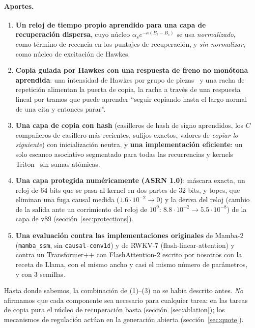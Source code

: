 \documentclass[11pt]{article}
\begin{document}
\paragraph{Aportes.}
\begin{enumerate}[label=(\arabic*)]
\item \textbf{Un reloj de tiempo propio aprendido para una capa de recuperación dispersa}, cuyo núcleo
  $\alpha_s e^{-\kappa(B_t-B_s)}$ se usa \emph{normalizado}, como término de recencia en los puntajes de recuperación,
  y \emph{sin normalizar}, como núcleo de excitación de Hawkes.
\item \textbf{Copia guiada por Hawkes con una respuesta de freno no monótona aprendida}: una intensidad de Hawkes por
  grupo de piezas~\cite{hawkes1971spectra} y una racha de repetición alimentan la puerta de copia, la racha a través de
  una respuesta lineal por tramos que puede aprender ``seguir copiando hasta el largo normal de una cita y entonces
  parar''.
\item \textbf{Una capa de copia con hash} (casilleros de hash de signo aprendidos, los $C$ compañeros de casillero más
  recientes, sufijos exactos, valores de \emph{copiar lo siguiente}) con inicialización neutra, y \textbf{una
  implementación eficiente}: un solo escaneo asociativo segmentado para todas las recurrencias y kernels
  Triton~\cite{tillet2019triton} sin sumas atómicas.
\item \textbf{Una capa protegida numéricamente (ASRN 1.0)}: máscara exacta, un reloj de 64 bits que se pasa al kernel en
  dos partes de 32 bits, y topes, que eliminan una fuga causal medida ($1.6\cdot10^{-2}\to0$) y la deriva del reloj
  (cambio de la salida ante un corrimiento del reloj de $10^9$: $8.8\cdot10^{-2}\to5.5\cdot10^{-8}$) de la capa de v89
  (sección~\ref{sec:protections}).
\item \textbf{Una evaluación contra las implementaciones originales} de Mamba-2 (\texttt{mamba\_ssm}, sin
  \texttt{causal-conv1d}) y de RWKV-7 (flash-linear-attention) y contra un Transformer++ con FlashAttention-2 escrito
  por nosotros con la receta de Llama, con el mismo ancho y casi el mismo número de parámetros, y con 3 semillas.
\end{enumerate}
Hasta donde sabemos, la combinación de (1)--(3) no se había descrito antes. \emph{No} afirmamos que cada componente sea
necesario para cualquier tarea: en las tareas de copia pura el núcleo de recuperación basta
(sección~\ref{sec:ablation}); los mecanismos de regulación actúan en la generación abierta (sección~\ref{sec:quote}).
\end{document}
